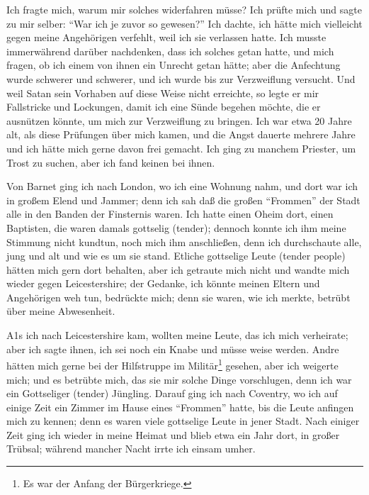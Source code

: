 Ich fragte mich, warum mir solches widerfahren müsse? Ich
prüfte mich und sagte zu mir selber: "`War ich je zuvor so gewesen?"' 
Ich dachte, ich hätte mich vielleicht gegen meine Angehörigen 
verfehlt, weil ich sie verlassen hatte. Ich musste immerwährend 
darüber nachdenken, dass ich solches getan hatte, und
mich fragen, ob ich einem von ihnen ein Unrecht getan hätte;
aber die Anfechtung wurde schwerer und schwerer, und ich wurde
bis zur Verzweiflung versucht. Und weil Satan sein Vorhaben
auf diese Weise nicht erreichte, so legte er mir Fallstricke und
Lockungen, damit ich eine Sünde begehen möchte, die er ausnützen 
könnte, um mich zur Verzweiflung zu bringen. Ich war
etwa 20 Jahre alt, als diese Prüfungen über mich kamen, und
die Angst dauerte mehrere Jahre und ich hätte mich gerne davon
frei gemacht. Ich ging zu manchem Priester, um Trost zu suchen,
aber ich fand keinen bei ihnen.

Von Barnet ging ich nach London, wo ich eine Wohnung nahm,
und dort war ich in großem Elend und Jammer; denn ich sah
daß die großen "`Frommen"' der Stadt alle in den Banden der
Finsternis waren. Ich hatte einen Oheim dort, einen Baptisten,
die waren damals gottselig (tender); dennoch konnte ich ihm meine
Stimmung nicht kundtun, noch mich ihm anschließen, denn ich
durchschaute alle, jung und alt und wie es um sie stand. Etliche
gottselige Leute (tender people) hätten mich gern dort behalten,
aber ich getraute mich nicht und wandte mich wieder gegen
Leicestershire; der Gedanke, ich könnte meinen Eltern und Angehörigen 
weh tun, bedrückte mich; denn sie waren, wie ich merkte,
betrübt über meine Abwesenheit.


A1s ich nach Leicestershire kam, wollten meine Leute, das ich
mich verheirate; aber ich sagte ihnen, ich sei noch ein Knabe und
müsse weise werden. Andre hätten mich gerne bei der Hilfstruppe
im Militär\footnote{Es war der Anfang der Bürgerkriege.}
gesehen, aber ich weigerte mich; und es betrübte mich,
das sie mir solche Dinge vorschlugen, denn ich war ein Gottseliger
(tender) Jüngling. Darauf ging ich nach Coventry, wo ich auf
einige Zeit ein Zimmer im Hause eines "`Frommen"' hatte, bis
die Leute anfingen mich zu kennen; denn es waren viele gottselige 
Leute in jener Stadt. Nach einiger Zeit ging ich wieder
in meine Heimat und blieb etwa ein Jahr dort, in großer Trübsal; 
während mancher Nacht irrte ich einsam umher.


